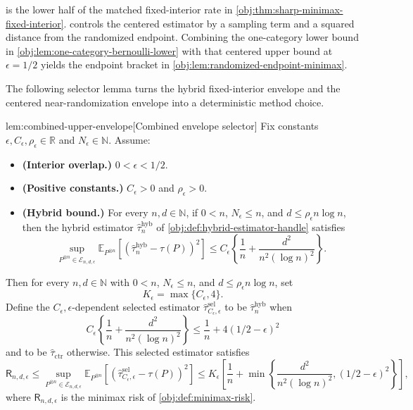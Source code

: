 \documentclass[11pt]{article}
\begin{document}
 is the lower half of the matched fixed-interior rate in \cref{obj:thm:sharp-minimax-fixed-interior}.  controls the centered estimator by a sampling term and a squared distance from the randomized endpoint. Combining the one-category lower bound in \cref{obj:lem:one-category-bernoulli-lower} with that centered upper bound at \(\epsilon=1/2\) yields the endpoint bracket in \cref{obj:lem:randomized-endpoint-minimax}.

The following selector lemma turns the hybrid fixed-interior envelope and the centered near-randomization envelope into a deterministic method choice.

\begin{lemmav}{lem:combined-upper-envelope}[Combined envelope selector]
Fix constants \(\epsilon,C_\epsilon,\rho_\epsilon\in\mathbb R\) and \(N_\epsilon\in\mathbb N\). Assume:
\begin{itemize}
\item \textbf{(Interior overlap.)} \(0<\epsilon<1/2\).
\item \textbf{(Positive constants.)} \(C_\epsilon>0\) and \(\rho_\epsilon>0\).
\item \textbf{(Hybrid bound.)} For every \(n,d\in\mathbb N\), if \(0<n\), \(N_\epsilon\le n\), and \(d\le \rho_\epsilon n\log n\), then the hybrid estimator \(\widehat\tau_n^{\mathrm{hyb}}\) of \cref{obj:def:hybrid-estimator-handle} satisfies
\[
\sup_{P^{\otimes n}\in\mathcal E_{n,d,\epsilon}}
\mathbb E_{P^{\otimes n}}\!\left[\left(\widehat\tau_n^{\mathrm{hyb}}-\tau(P)\right)^2\right]
\le
C_\epsilon\left\{\frac1n+\frac{d^2}{n^2(\log n)^2}\right\}.
\]
\end{itemize}
Then for every \(n,d\in\mathbb N\) with \(0<n\), \(N_\epsilon\le n\), and \(d\le \rho_\epsilon n\log n\), set
\[
K_\epsilon=\max\{C_\epsilon,4\}.
\]
Define the \(C_\epsilon,\epsilon\)-dependent selected estimator \(\widehat\tau^{\mathrm{sel}}_{C_\epsilon,\epsilon}\) to be \(\widehat\tau_n^{\mathrm{hyb}}\) when
\[
C_\epsilon\left\{\frac1n+\frac{d^2}{n^2(\log n)^2}\right\}
\le
\frac1n+4(1/2-\epsilon)^2
\]
and to be \(\widehat\tau_{\mathrm{ctr}}\) otherwise. This selected estimator satisfies
\[
\mathsf R_{n,d,\epsilon}\le
\sup_{P^{\otimes n}\in\mathcal E_{n,d,\epsilon}}
\mathbb E_{P^{\otimes n}}\!\left[\left(\widehat\tau^{\mathrm{sel}}_{C_\epsilon,\epsilon}-\tau(P)\right)^2\right]
\le
K_\epsilon\left[
\frac1n+
\min\left\{\frac{d^2}{n^2(\log n)^2},(1/2-\epsilon)^2\right\}
\right],
\]
where \(\mathsf R_{n,d,\epsilon}\) is the minimax risk of \cref{obj:def:minimax-risk}.
\end{lemmav}
\end{document}
